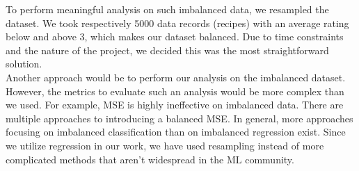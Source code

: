 \documentclass{article}
\begin{document}
To perform meaningful analysis on such imbalanced data, we resampled the dataset. We took respectively 5000 data records (recipes) with an average rating below and above $3$, which makes our dataset balanced. Due to time constraints and the nature of the project, we decided this was the most straightforward solution. \\
Another approach would be to perform our analysis on the imbalanced dataset. However, the metrics to evaluate such an analysis would be more complex than we used. For example, MSE is highly ineffective on imbalanced data. There are multiple approaches to introducing a balanced MSE\cite{Jiawei:2022}\cite{Yang:2021}. In general, more approaches focusing on imbalanced classification than on imbalanced regression exist. Since we utilize regression in our work, we have used resampling instead of more complicated methods that aren't widespread in the ML community.
\end{document}
